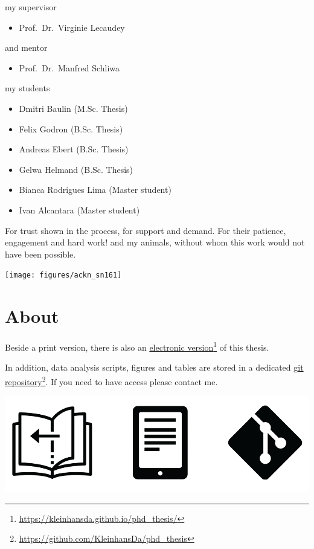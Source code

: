\documentclass[11pt,singlespacinge,twoside]{reedthesis} %
\providecommand{\tightlist}{%
  \setlength{\itemsep}{0pt}\setlength{\parskip}{0pt}}
\theoremstyle{definition}
\theoremstyle{definition}
\theoremstyle{definition}
\theoremstyle{remark}
\begin{document}
\noindent my supervisor
\begin{itemize}
\tightlist
\item
  Prof.~Dr.~Virginie Lecaudey
\end{itemize}
\noindent and mentor
\begin{itemize}
\tightlist
\item
  Prof.~Dr.~Manfred Schliwa
\end{itemize}
\noindent my students
\begin{itemize}
\tightlist
\item
  Dmitri Baulin (M.Sc. Thesis)
\item
  Felix Godron (B.Sc. Thesis)
\item
  Andreas Ebert (B.Sc. Thesis)
\item
  Gelwa Helmand (B.Sc. Thesis)
\item
  Bianca Rodrigues Lima (Master student)
\item
  Ivan Alcantara (Master student)
\end{itemize}
For trust shown in the process, for support and demand. \newline For their patience, engagement and hard work!
\newline\newline
\noindent and my animals, without whom this work would not have been possible.
\begin{center}\texttt{[image: figures/ackn\_sn161]} \end{center}

\newpage

\hypertarget{about}{%
\section*{About}\label{about}}

\vspace{1cm}

\noindent Beside a print version, there is also an \href{https://kleinhansda.github.io/phd_thesis/}{electronic version}\footnote{\url{https://kleinhansda.github.io/phd_thesis/}} of this thesis.

\noindent In addition, data analysis scripts, figures and tables are stored in a dedicated \href{https://github.com/KleinhansDa/phd_thesis}{git repository}\footnote{\url{https://github.com/KleinhansDa/phd_thesis}}. If you need to have access please contact me.

\includegraphics{figures/versions/versions.png}
\end{document}
